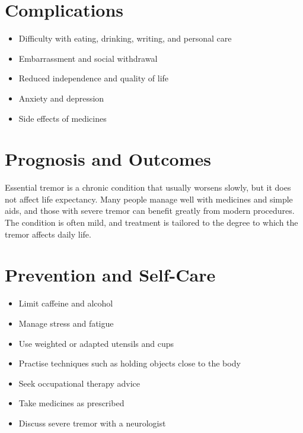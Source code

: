 \section*{Complications}
\begin{itemize}
    \item Difficulty with eating, drinking, writing, and personal care
    \item Embarrassment and social withdrawal
    \item Reduced independence and quality of life
    \item Anxiety and depression
    \item Side effects of medicines
\end{itemize}

\section*{Prognosis and Outcomes}
Essential tremor is a chronic condition that usually worsens slowly, but it does not affect life expectancy. Many people manage well with medicines and simple aids, and those with severe tremor can benefit greatly from modern procedures. The condition is often mild, and treatment is tailored to the degree to which the tremor affects daily life.

\section*{Prevention and Self-Care}
\begin{itemize}
    \item Limit caffeine and alcohol
    \item Manage stress and fatigue
    \item Use weighted or adapted utensils and cups
    \item Practise techniques such as holding objects close to the body
    \item Seek occupational therapy advice
    \item Take medicines as prescribed
    \item Discuss severe tremor with a neurologist
\end{itemize}

